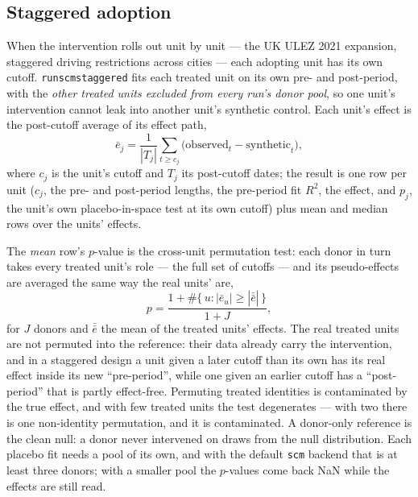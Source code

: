 \documentclass[11pt]{report}
\newcommand{\codeunderscore}{\textunderscore\allowbreak}
\newcommand{\code}[1]{\texttt{\let\_\codeunderscore #1}}
\begin{document}
\subsection{Staggered adoption}\label{sec:scmstaggered}
When the intervention rolls out unit by unit — the UK ULEZ 2021 expansion, staggered
driving restrictions across cities — each adopting unit has its own cutoff.
\code{run\_scm\_staggered} fits each treated unit on its own pre- and post-period, with
the \emph{other treated units excluded from every run's donor pool}, so one unit's
intervention cannot leak into another unit's synthetic control. Each unit's effect is
the post-cutoff average of its effect path,
\begin{equation}
  \bar{e}_j = \frac{1}{|T_j|} \sum_{t \ge c_j} \bigl(\text{observed}_t -
  \text{synthetic}_t\bigr),
\end{equation}
where $c_j$ is the unit's cutoff and $T_j$ its post-cutoff dates; the result is one row
per unit ($c_j$, the pre- and post-period lengths, the pre-period fit $R^2$, the effect,
and $p_j$, the unit's own placebo-in-space test at its own cutoff) plus mean and median
rows over the units' effects.

The \emph{mean} row's $p$-value is the cross-unit permutation test: each donor in turn
takes every treated unit's role — the full set of cutoffs — and its pseudo-effects are
averaged the same way the real units' are,
\begin{equation}
  p = \frac{1 + \#\{\,u : |\bar{e}_u| \ge |\bar{\bar{e}}|\,\}}{1 + J},
\end{equation}
for $J$ donors and $\bar{\bar{e}}$ the mean of the treated units' effects. The real
treated units are not permuted into the reference: their data already carry the
intervention, and in a staggered design a unit given a later cutoff than its own has its
real effect inside its new ``pre-period'', while one given an earlier cutoff has a
``post-period'' that is partly effect-free. Permuting treated identities is contaminated
by the true effect, and with few treated units the test degenerates — with two there is
one non-identity permutation, and it is contaminated. A donor-only reference is the clean
null: a donor never intervened on draws from the null distribution. Each placebo fit
needs a pool of its own, and with the default \code{scm} backend that is at least three
donors; with a smaller pool the $p$-values come back NaN while the effects are still
read.
\end{document}
